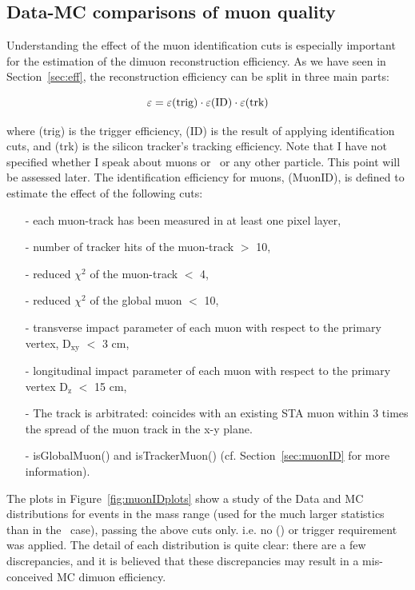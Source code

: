 \subsection{Data-MC comparisons of muon quality}
\label{sec:data_mc_muon}

 Understanding the effect of the muon identification cuts is
especially important for the estimation of the dimuon reconstruction
efficiency. As we have seen in Section~\ref{sec:eff}, the
reconstruction efficiency can be split in three main parts:

\begin{equation}
\varepsilon = \varepsilon(\rm trig) \cdot \varepsilon(\rm ID) \cdot \varepsilon(\rm trk)
\end{equation}

where \eff(trig) is the trigger efficiency, \eff(ID) is
the result of applying identification cuts, and \eff(trk) is
the silicon tracker's tracking efficiency. Note that I have not
specified whether I speak about muons or \PgU\ or any other
particle. This point will be assessed later. The identification efficiency
for muons, \eff(MuonID), is defined to estimate the effect of the
following cuts:

\begin{itemize}
    \item[-] each muon-track has been measured in at least one pixel
      layer, 
    \item[-] number of tracker hits of the muon-track $>$ 10, 
    \item[-] reduced $\chi^{2}$ of the muon-track $<$ 4,
    \item[-] reduced $\chi^{2}$ of the global muon $<$ 10, 
    \item[-] transverse impact parameter of each muon with respect to the primary
      vertex, D$_{\textrm{xy}}$ $<$ 3 cm,
    \item[-] longitudinal impact parameter of each muon with respect to
      the primary vertex  D$_{\textrm{z}}$ $<$ 15 cm,
    \item[-] The track is arbitrated: coincides with an existing STA muon within 3
      times the spread of the muon track in the x-y plane.
    \item[-] isGlobalMuon() and isTrackerMuon()
      (cf. Section~\ref{sec:muonID} for more information).
\end{itemize}

The plots in Figure~\ref{fig:muonIDplots} show a study of the Data and MC
distributions for events in the \Jpsi mass range (used for the much
larger statistics than in the \PgU\ case), passing the above
cuts only. i.e. no \pt(\Pgm) or trigger requirement was applied. The detail of
each distribution is quite clear: there are a few discrepancies,
and it is believed that these discrepancies may result in a mis-conceived
MC dimuon efficiency.

